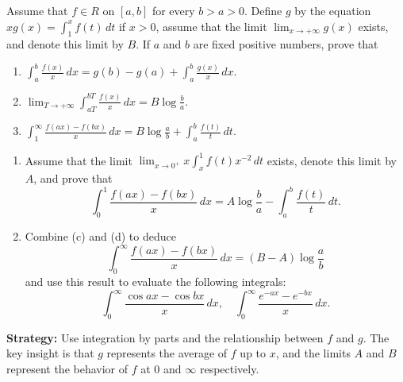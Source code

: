 \begin{problembox}
\begin{problemstatement}
Assume that $f \in R$ on $[a, b]$ for every $b > a > 0$. Define $g$ by the equation $xg(x) = \int_{1}^{x} f(t) \, dt$ if $x > 0$, assume that the limit $\lim_{x \to +\infty} g(x)$ exists, and denote this limit by $B$. If $a$ and $b$ are fixed positive numbers, prove that
\begin{enumerate}[label=(\alph*)]
\item $\int_{a}^{b} \frac{f(x)}{x} \, dx = g(b) - g(a) + \int_{a}^{b} \frac{g(x)}{x} \, dx.$
\item $\lim_{T \to +\infty} \int_{aT}^{bT} \frac{f(x)}{x} \, dx = B \log \frac{b}{a}.$
\item $\int_{1}^{\infty} \frac{f(ax) - f(bx)}{x} \, dx = B \log \frac{a}{b} + \int_{a}^{b} \frac{f(t)}{t} \, dt.$
\end{enumerate}
\begin{enumerate}[label=(\alph*),resume]
\item Assume that the limit $\lim_{x \to 0^+} x \int_{x}^{1} f(t)x^{-2} \, dt$ exists, denote this limit by $A$, and prove that
\[\int_{0}^{1} \frac{f(ax) - f(bx)}{x} \, dx = A \log \frac{b}{a} - \int_{a}^{b} \frac{f(t)}{t} \, dt.\]
\item Combine (c) and (d) to deduce
\[\int_{0}^{\infty} \frac{f(ax) - f(bx)}{x} \, dx = (B - A) \log \frac{a}{b}\]
and use this result to evaluate the following integrals:
\[\int_{0}^{\infty} \frac{\cos ax - \cos bx}{x} \, dx, \quad \int_{0}^{\infty} \frac{e^{-ax} - e^{-bx}}{x} \, dx.\]
\end{enumerate}
\end{problemstatement}
\end{problembox}

\noindent\textbf{Strategy:} Use integration by parts and the relationship between $f$ and $g$. The key insight is that $g$ represents the average of $f$ up to $x$, and the limits $A$ and $B$ represent the behavior of $f$ at $0$ and $\infty$ respectively.

